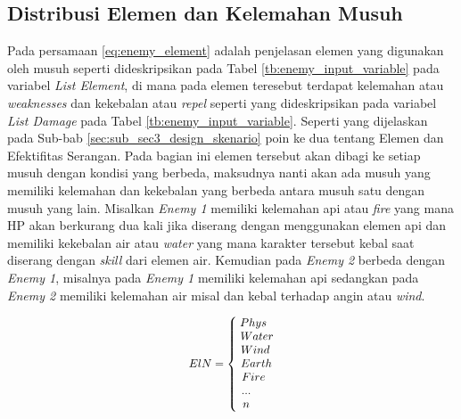 \subsection{Distribusi Elemen dan Kelemahan Musuh}
\label{sec:sub_sec3_enemy_weak}
\vspace{1ex}

Pada persamaan \ref{eq:enemy_element} adalah penjelasan elemen yang digunakan oleh musuh seperti dideskripsikan pada Tabel \ref{tb:enemy_input_variable} pada variabel \textit{List Element}, di mana pada elemen teresebut terdapat kelemahan atau \textit{weaknesses} dan kekebalan atau \textit{repel} seperti yang dideskripsikan pada variabel \textit{List Damage} pada Tabel \ref{tb:enemy_input_variable}.  Seperti yang dijelaskan pada Sub-bab \ref{sec:sub_sec3_design_skenario} poin ke dua tentang Elemen dan Efektifitas Serangan. Pada bagian ini elemen tersebut akan dibagi ke setiap musuh dengan kondisi yang berbeda, maksudnya nanti akan ada musuh yang memiliki kelemahan dan kekebalan yang berbeda antara musuh satu dengan musuh yang lain. Misalkan \textit{Enemy 1} memiliki kelemahan api atau \textit{fire} yang mana HP akan berkurang dua kali jika diserang dengan menggunakan elemen api dan memiliki kekebalan air atau \textit{water} yang mana karakter tersebut kebal saat diserang dengan \textit{skill} dari elemen air. Kemudian pada \textit{Enemy 2} berbeda dengan \textit{Enemy 1}, misalnya pada \textit{Enemy 1} memiliki kelemahan api sedangkan pada \textit{Enemy 2} memiliki kelemahan air misal dan kebal terhadap angin atau \textit{wind}.

\begin{equation}\label{eq:enemy_element}
\resizebox{0.2\textwidth}{!}{%
	$ElN = \left\{\begin{matrix}
	\hspace{-0.34em} Phys \\ 
	\hspace{0.3em} Water \\
	\hspace{0.0em} Wind \\
	\hspace{0.2em} Earth \\
	\hspace{-0.3em} Fire \\
	\hspace{-1.6em} ... \\
	\hspace{-1.6em} n
	\end{matrix}\right.$%
}
\end{equation}

